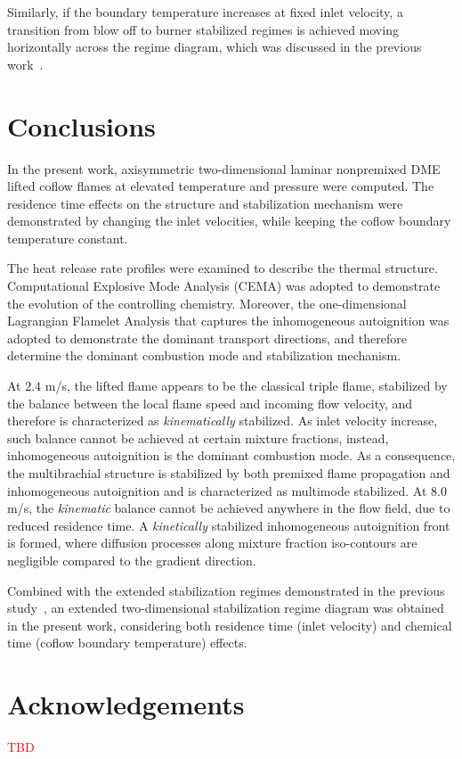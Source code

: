 \documentclass{wssci}
\begin{document}
Similarly, if the boundary temperature increases at fixed inlet velocity, a transition from blow off to burner stabilized regimes is achieved moving horizontally across the regime diagram, which was discussed in the previous work~\cite{deng15}.     


\section{Conclusions}

In the present work, axisymmetric two-dimensional laminar nonpremixed DME lifted coflow flames at elevated temperature and pressure were computed.  The residence time effects on the structure and stabilization mechanism were demonstrated by changing the inlet velocities, while keeping the coflow boundary temperature constant.

The heat release rate profiles were examined to describe the thermal structure.  Computational Explosive Mode Analysis (CEMA) was adopted to demonstrate the evolution of the controlling chemistry.  Moreover, the one-dimensional Lagrangian Flamelet Analysis that captures the inhomogeneous autoignition was adopted to demonstrate the dominant transport directions, and therefore determine the dominant combustion mode and stabilization mechanism.

At $2.4$ m/s, the lifted flame appears to be the classical triple flame, stabilized by the balance between the local flame speed and incoming flow velocity, and therefore is characterized as \emph {kinematically} stabilized.  As inlet velocity increase, such balance cannot be achieved at certain mixture fractions, instead, inhomogeneous autoignition is the dominant combustion mode.  As a consequence, the multibrachial structure is stabilized by both premixed flame propagation and inhomogeneous autoignition and is characterized as multimode stabilized.  At $8.0$ m/s, the \emph{kinematic} balance cannot be achieved anywhere in the flow field, due to reduced residence time.  A \emph {kinetically} stabilized inhomogeneous autoignition front is formed, where diffusion processes along mixture fraction iso-contours are negligible compared to the gradient direction.

Combined with the extended stabilization regimes demonstrated in the previous study~\cite{deng15}, an extended two-dimensional stabilization regime diagram was obtained in the present work, considering both residence time (inlet velocity) and chemical time (coflow boundary temperature) effects.  


\section{Acknowledgements}

\textcolor{red}{TBD}


 
\end{document}
